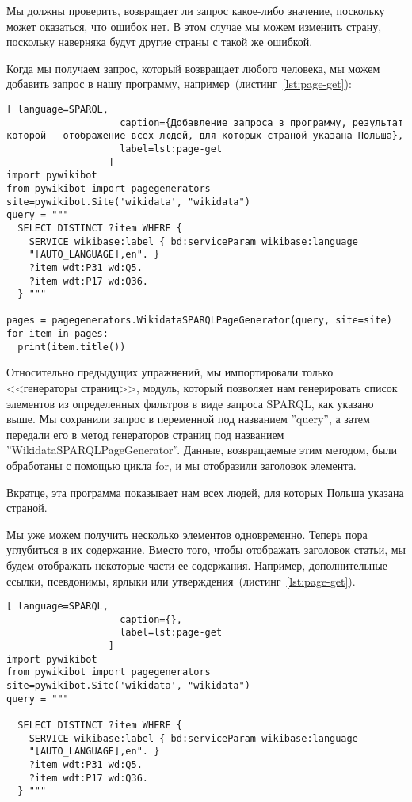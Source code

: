{Мы должны проверить, возвращает ли запрос какое-либо значение, поскольку может оказаться, что ошибок нет. В этом случае мы можем изменить страну, поскольку наверняка будут другие страны с такой же ошибкой.

Когда мы получаем запрос, который возвращает любого человека, мы можем добавить запрос в нашу программу, например~(листинг~\ref{lst:page-get}):

\begin{lstlisting}[ language=SPARQL,
                    caption={Добавление запроса в программу, результат которой - отображение всех людей, для которых страной указана Польша},
                    label=lst:page-get
                  ]
import pywikibot
from pywikibot import pagegenerators
site=pywikibot.Site('wikidata', "wikidata")
query = """
  SELECT DISTINCT ?item WHERE {
    SERVICE wikibase:label { bd:serviceParam wikibase:language 
    "[AUTO_LANGUAGE],en". }
    ?item wdt:P31 wd:Q5.
    ?item wdt:P17 wd:Q36.
  } """

pages = pagegenerators.WikidataSPARQLPageGenerator(query, site=site)
for item in pages:
  print(item.title())
\end{lstlisting}    

Относительно предыдущих упражнений, мы импортировали только <<генераторы страниц>>, модуль, который позволяет нам генерировать список элементов из определенных фильтров в виде запроса SPARQL, как указано выше. Мы сохранили запрос в переменной под названием ''query'', а затем передали его в метод генераторов страниц под названием ''WikidataSPARQLPageGenerator''. Данные, возвращаемые этим методом, были обработаны с помощью цикла for, и мы отобразили заголовок элемента.

Вкратце, эта программа показывает нам всех людей, для которых Польша указана страной.

Мы уже можем получить несколько элементов одновременно. Теперь пора углубиться в их содержание. Вместо того, чтобы отображать заголовок статьи, мы будем отображать некоторые части ее содержания. Например, дополнительные ссылки, псевдонимы, ярлыки или утверждения~(листинг~\ref{lst:page-get}).

\begin{lstlisting}[ language=SPARQL,
                    caption={},
                    label=lst:page-get
                  ]
import pywikibot
from pywikibot import pagegenerators
site=pywikibot.Site('wikidata', "wikidata")
query = """

  SELECT DISTINCT ?item WHERE {
    SERVICE wikibase:label { bd:serviceParam wikibase:language 
    "[AUTO_LANGUAGE],en". }
    ?item wdt:P31 wd:Q5.
    ?item wdt:P17 wd:Q36.
  } """


\end{lstlisting}}
